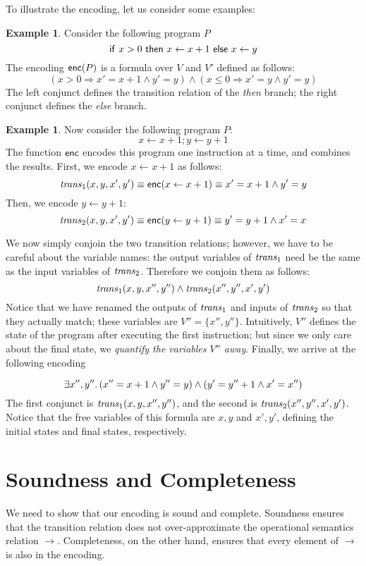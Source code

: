 \documentclass{amsart}
\theoremstyle{definition}
\newtheorem{example}[theorem]{Example}
\theoremstyle{remark}
\numberwithin{equation}{section}
\begin{document}
To illustrate the encoding, let us consider some examples:

\begin{example}
  Consider the following program $P$
  $$\mathsf{if}~ x > 0 ~ \mathsf{then}~ x \gets x + 1 ~\mathsf{else}~ x \gets y$$
  The encoding $\mathsf{enc}(P)$ is a formula over $V$ and $V'$
  defined as follows:
  $$(x > 0 \Rightarrow x' = x + 1 \land y' = y)
  \land (x \leq 0 \Rightarrow x' = y \land y' = y)$$
  The left conjunct defines the transition relation
  of the \emph{then} branch;
  the right conjunct defines the \emph{else} branch.
\end{example}

\begin{example}
  Now consider the following program $P$:
  $$x \gets x + 1; y \gets y + 1$$
  The function $\mathsf{enc}$ encodes this program
  one instruction at a time, and combines the results.
  First, we  encode $x \gets x + 1$ as follows:
  $$\mathit{trans}_1(x,y,x',y') \equiv
  \mathsf{enc}(x \gets x + 1) \equiv
  x' = x + 1 \land y' = y$$
  Then, we  encode $y \gets y + 1$:
  $$\mathit{trans}_2(x,y,x',y') \equiv
  \mathsf{enc}(y \gets y + 1) \equiv
  y' = y + 1 \land x' = x$$

  We now simply conjoin the two transition relations;
  however, we have to be careful about the variable
  names: the output variables of $\mathit{trans}_1$ need be the same as
  the input variables of $\mathit{trans}_2$.
  Therefore we conjoin them as follows:
  $$\mathit{trans}_1(x,y,x'',y'') \land \mathit{trans}_2(x'',y'',x',y')$$
  Notice that we have renamed the outputs of $\mathit{trans}_1$
  and inputs of $\mathit{trans}_2$ so that they actually match;
  these variables are $V'' = \{x'',y''\}$.
  Intuitively, $V''$ defines the state of the program
  after executing the first instruction;
  but since we only care about the final state,
  we \emph{quantify the variables $V''$ away}.
  Finally, we arrive at the following encoding

  $$\exists x'',y'' \ldotp
  (x'' = x + 1 \land y'' = y) \land
  (y' = y'' + 1 \land x' = x'')$$
  The first conjunct is $\mathit{trans}_1(x,y,x'',y'')$,
  and the second is
  $\mathit{trans}_2(x'',y'',x',y')$.
  Notice that the free variables of this formula
  are $x,y$ and $x',y'$, defining the initial states
  and final states, respectively.
\end{example}


\section{Soundness and Completeness}
We need to show that our encoding
is sound and complete.
Soundness ensures that
the transition relation does not over-approximate
the operational semantics relation $\to$.
Completeness, on the other hand,
ensures that every element of $\to$ is also in
the encoding.
\end{document}
